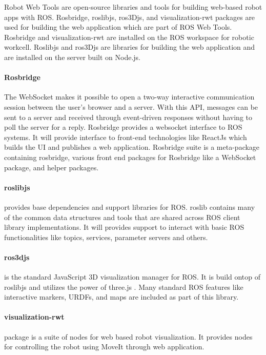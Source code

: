 Robot Web Tools are open-source libraries and tools for building web-based robot apps with ROS. Rosbridge, roslibjs, ros3Djs, and visualization-rwt packages
are used for building the web application which are part of ROS Web Tools. \cite{webtools} Rosbridge and visualization-rwt are installed on the ROS workspace
for robotic workcell. Roslibjs and ros3Djs are libraries for building the web application and are installed on the server built on Node.js.

\paragraph{Rosbridge}
\label{par:rosbridge}
The WebSocket makes it possible to open a two-way interactive communication session between the user's browser and a server.
With this API, messages can be sent to a server and received through event-driven responses without having to poll the server for a reply. \cite{websocket}
Rosbridge provides a websocket interface to ROS systems. It will provide interface to front-end technologies like ReactJs which builds the UI
and publishes a web application. Rosbridge suite is a meta-package containing rosbridge, various front end packages for Rosbridge 
like a WebSocket package, and helper packages. \cite{rosbridge}

\paragraph{roslibjs}
\label{par:roslibjs}
provides base dependencies and support libraries for ROS. roslib contains many of the common data structures and tools that are shared across
ROS client library implementations. \cite{roslib} It will provides support to interact with basic ROS functionalities like topics, services, parameter servers and others.

\paragraph{ros3djs}
\label{par:ros3djs}
is the standard JavaScript 3D visualization manager for ROS. It is build ontop of roslibjs and utilizes the power of three.js \cite{threejs}.
Many standard ROS features like interactive markers, URDFs, and maps are included as part of this library. \cite{ros3djs}

\paragraph{visualization-rwt}
\label{par:visualization-rwt}
package is a suite of nodes for web based robot visualization. It provides nodes for controlling the robot using MoveIt through web application.
\cite{visualization-rwt}
